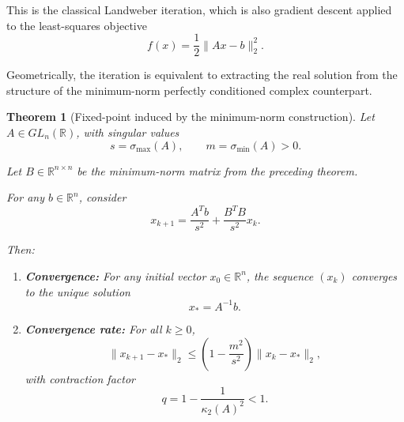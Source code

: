 \documentclass[11pt, reqno, a4paper]{amsart}
\theoremstyle{plain}
\newtheorem{theorem}{Theorem}[section]
\theoremstyle{definition}
\theoremstyle{remark}
\numberwithin{equation}{section}
\begin{document}
This is the classical Landweber iteration, which is also gradient descent applied to the least-squares objective
\[
f(x)=\frac12\|Ax-b\|_2^2.
\]


Geometrically, the iteration is equivalent to extracting the real solution from the structure of the minimum-norm perfectly conditioned complex counterpart.

\begin{theorem}[Fixed-point induced by the minimum-norm construction]
Let $A\in GL_n(\mathbb{R})$, with singular values
\[
s=\sigma_{\max}(A),
\qquad
m=\sigma_{\min}(A)>0.
\]

Let $B\in\mathbb{R}^{n\times n}$ be the minimum-norm matrix from the preceding theorem.

For any $b\in\mathbb{R}^n$, consider
\[
x_{k+1}
=
\frac{A^Tb}{s^2}
+
\frac{B^TB}{s^2}x_k.
\]

Then:

\begin{enumerate}[label=\roman*)]
    \item \textbf{Convergence:} For any initial vector $x_0\in\mathbb{R}^n$, the sequence $(x_k)$ converges to the unique solution
    \[
    x_*=A^{-1}b.
    \]

    \item \textbf{Convergence rate:} For all $k\geq0$,
    \[
    \|x_{k+1}-x_*\|_2
    \leq
    \left(1-\frac{m^2}{s^2}\right)
    \|x_k-x_*\|_2,
    \]
    with contraction factor
    \[
    q=1-\frac{1}{\kappa_2(A)^2}<1.
    \]
\end{enumerate}
\end{theorem}
\end{document}
